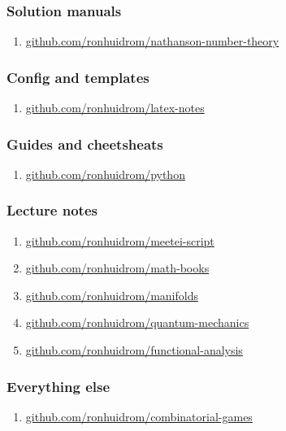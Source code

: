 \documentclass{article}
\begin{document}
\subsubsection*{Solution manuals}

\begin{enumerate}[resume]
\item \href{https://github.com/ronhuidrom/nathanson-number-theory}{github.com/ronhuidrom/nathanson-number-theory}
\end{enumerate}

\subsubsection*{Config and templates}

\begin{enumerate}[resume]
\item \href{https://github.com/ronhuidrom/latex-notes}{github.com/ronhuidrom/latex-notes}
\end{enumerate}

\subsubsection*{Guides and cheetsheats}

\begin{enumerate}[resume]
\item \href{https://github.com/ronhuidrom/python}{github.com/ronhuidrom/python}
\end{enumerate}

\subsubsection*{Lecture notes}

\begin{enumerate}[resume]
\item \href{https://github.com/ronhuidrom/meetei-script}{github.com/ronhuidrom/meetei-script} 
\item \href{https://github.com/ronhuidrom/math-books}{github.com/ronhuidrom/math-books}
\item \href{https://github.com/ronhuidrom/manifolds}{github.com/ronhuidrom/manifolds}
\item \href{https://github.com/ronhuidrom/quantum-mechanics}{github.com/ronhuidrom/quantum-mechanics}
\item \href{https://github.com/ronhuidrom/functional-analysis}{github.com/ronhuidrom/functional-analysis}
\end{enumerate}

\subsubsection*{Everything else}

\begin{enumerate}[resume]
\item \href{https://github.com/ronhuidrom/combinatorial-games}{github.com/ronhuidrom/combinatorial-games}
\end{enumerate}
\end{document}
